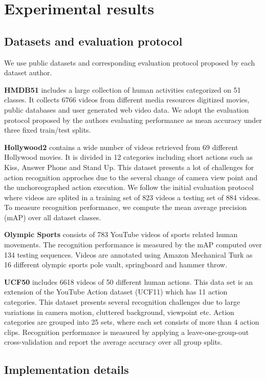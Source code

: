 \section{Experimental results}
\label{results}
\subsection{Datasets and evaluation protocol}
We use public datasets and corresponding evaluation protocol proposed by each dataset author.

\textbf{HMDB51} \cite{kuehne2011} includes a large collection of human activities categorized on 51 classes. It collects 6766 videos from different media resources \ie digitized movies, public databases and user generated web video data. We adopt the evaluation protocol proposed by the authors evaluating performance as mean accuracy under three fixed train/test splits.

\textbf{Hollywood2} \cite{marszalek2009} contains a wide number of videos retrieved from 69 different Hollywood movies. It is divided in 12 categories including short actions such as Kiss, Answer Phone and Stand Up. This dataset presents a lot of challenges for action recognition approches due to the several change of camera view point and the unchoreographed action execution. We follow the initial evaluation protocol where videos are splited in a training set of 823 videos a testing set of 884 videos. To measure recognition performance, we compute the mean average precision (mAP) over all dataset 
classes.

\textbf{Olympic Sports} \cite{niebles2010} consists of 783 YouTube videos of sports related human movements. The recognition performance is measured 
by the mAP computed over 134 testing sequences. Videos are annotated using Amazon Mechanical Turk as 16 different olympic sports \eg pole vault, springboard and hammer throw.

\textbf{UCF50} \cite{reddy2013} includes 6618 videos of 50 different human actions. This data set is an extension of the YouTube Action dataset (UCF11) which has 11 action categories. This dataset presents several recognition challenges due to large variations in camera motion, cluttered background, viewpoint etc. Action categories are grouped into 25 sets, where each set consists of more than 4 action clips. Recognition performance is measured by applying a leave-one-group-out cross-validation and report the average accuracy over all group splits. 

\subsection{Implementation details}

